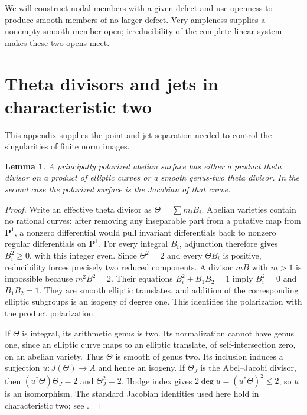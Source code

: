 \documentclass[11pt]{article}
\newtheorem{lemma}[theorem]{Lemma}
\theoremstyle{definition}\newtheorem{definition}[theorem]{Definition}
\theoremstyle{remark}\newtheorem{remark}[theorem]{Remark}
\newcommand{\PP}{\mathbf P}
\begin{document}
We will construct nodal members with a given defect and use openness to produce smooth members of no larger defect. Very ampleness supplies a nonempty smooth-member open; irreducibility of the complete linear system makes these two opens meet.

\section{Theta divisors and jets in characteristic two}
This appendix supplies the point and jet separation needed to control the singularities of finite norm images.


\begin{lemma}\label{lem:dichotomy}
A principally polarized abelian surface has either a product theta divisor on a product of elliptic curves or a smooth genus-two theta divisor. In the second case the polarized surface is the Jacobian of that curve.
\end{lemma}
\begin{proof}
Write an effective theta divisor as $\Theta=\sum m_iB_i$. Abelian varieties contain no rational curves: after removing any inseparable part from a putative map from $\PP^1$, a nonzero differential would pull invariant differentials back to nonzero regular differentials on $\PP^1$. For every integral $B_i$, adjunction therefore gives $B_i^2\ge0$, with this integer even. Since $\Theta^2=2$ and every $\Theta B_i$ is positive, reducibility forces precisely two reduced components. A divisor $mB$ with $m>1$ is impossible because $m^2B^2=2$. Their equations $B_i^2+B_1B_2=1$ imply $B_i^2=0$ and $B_1B_2=1$. They are smooth elliptic translates, and addition of the corresponding elliptic subgroups is an isogeny of degree one. This identifies the polarization with the product polarization.

If $\Theta$ is integral, its arithmetic genus is two. Its normalization cannot have genus one, since an elliptic curve maps to an elliptic translate, of self-intersection zero, on an abelian variety. Thus $\Theta$ is smooth of genus two. Its inclusion induces a surjection $u:J(\Theta)\to A$ and hence an isogeny. If $\Theta_J$ is the Abel--Jacobi divisor, then $(u^*\Theta)\Theta_J=2$ and $\Theta_J^2=2$. Hodge index gives $2\deg u=(u^*\Theta)^2\le2$, so $u$ is an isomorphism. The standard Jacobian identities used here hold in characteristic two; see \citet[Theorem~14.23, Corollary~14.24, pp.~230--231; Theorem~14.29, p.~233; Example~14.34, pp.~236--237]{EGM}.
\end{proof}
\end{document}
